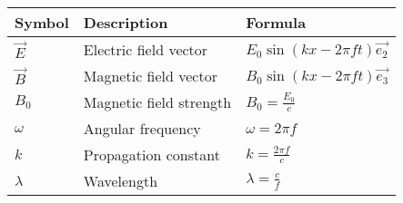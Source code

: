 \setlength{\arrayrulewidth}{0.3mm}
\setlength{\tabcolsep}{15pt}
\renewcommand{\arraystretch}{1.5}

\begin{center}
\begin{tabular}{ |p{1cm}|p{1.5cm}|p{2.7cm}|  }
\hline

Symbol& Description&Formula\\
\hline
$\vec{E}$ & Electric field vector & $E_0\sin(kx - 2\pi f t)\vec{e_2}$\\
\hline
$\vec{B}$ & Magnetic field vector & $B_0\sin(kx - 2 \pi f t)\vec{e_3}$\\
\hline
$B_0$ & Magnetic field strength & $B_0 = \frac{E_0}{c}$\\
\hline
$\omega$ & Angular frequency & $\omega = 2\pi f$\\
\hline
$k$ &Propagation constant & $k = \frac{2\pi f}{c}$\\
\hline
$\lambda$ & Wavelength & $\lambda = \frac{c}{f}$\\
\hline

\end{tabular}
\end{center}